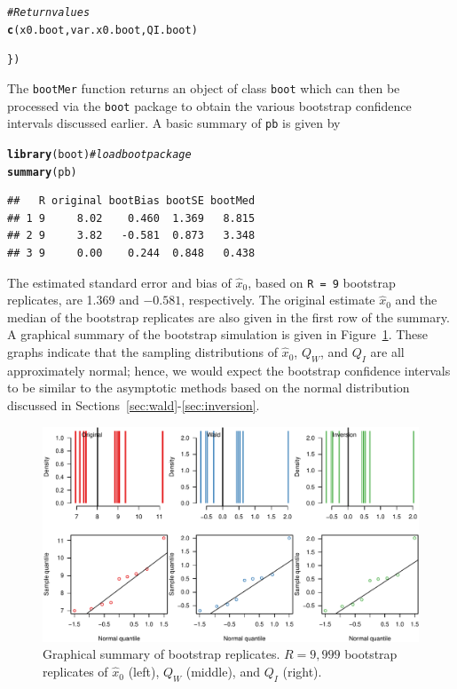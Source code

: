 \documentclass{article}\usepackage[]{graphicx}\usepackage[]{color}
\makeatletter
\newcommand{\hlcom}[1]{\textcolor[rgb]{0.678,0.584,0.686}{\textit{#1}}}%
\newcommand{\hlstd}[1]{\textcolor[rgb]{0.345,0.345,0.345}{#1}}%
\newcommand{\hlkwd}[1]{\textcolor[rgb]{0.737,0.353,0.396}{\textbf{#1}}}%
\newenvironment{kframe}{%
 \def\at@end@of@kframe{}%
 \ifinner\ifhmode%
  \def\at@end@of@kframe{\end{minipage}}%
  \begin{minipage}{\columnwidth}%
 \fi\fi%
 \def\FrameCommand##1{\hskip\@totalleftmargin \hskip-\fboxsep
 \colorbox{shadecolor}{##1}\hskip-\fboxsep
     \hskip-\linewidth \hskip-\@totalleftmargin \hskip\columnwidth}%
 \MakeFramed {\advance\hsize-\width
   \@totalleftmargin\z@ \linewidth\hsize
   \@setminipage}}%
 {\par\unskip\endMakeFramed%
 \at@end@of@kframe}
\newenvironment{knitrout}{}{} %
\makeatother
\begin{document}
\begin{knitrout}
\begin{kframe}
\begin{alltt}
  \hlcom{# Return values}
  \hlkwd{c}\hlstd{(x0.boot, var.x0.boot, QI.boot)}

\hlstd{\})}
\end{alltt}
\end{kframe}
\end{knitrout}
The \texttt{bootMer} function returns an object of class \texttt{boot} which can then be processed via the \texttt{boot} package to obtain the various bootstrap confidence intervals discussed earlier.  A basic summary of \texttt{pb} is given by
\begin{knitrout}
\color{fgcolor}\begin{kframe}
\begin{alltt}
\hlkwd{library}\hlstd{(boot)}  \hlcom{# load boot package}
\hlkwd{summary}\hlstd{(pb)}
\end{alltt}
\begin{verbatim}
##   R original bootBias bootSE bootMed
## 1 9     8.02    0.460  1.369   8.815
## 2 9     3.82   -0.581  0.873   3.348
## 3 9     0.00    0.244  0.848   0.438
\end{verbatim}
\end{kframe}
\end{knitrout}
The estimated standard error and bias of $\widehat{x}_0$, based on \texttt{R = 9} bootstrap replicates, are 1.369 and \ensuremath{-0.581}, respectively.  The original estimate $\widehat{x}_0$ and the median of the bootstrap replicates are also given in the first row of the summary.  A graphical summary of the bootstrap simulation is given in Figure~\ref{fig:boot-plots}.  These graphs indicate that the sampling distributions of $\widehat{x}_0$, $Q_W$, and $Q_I$ are all approximately normal; hence, we would expect the bootstrap confidence intervals to be similar to the asymptotic methods based on the normal distribution discussed in Sections~\ref{sec:wald}-\ref{sec:inversion}.
\begin{knitrout}
\color{fgcolor}\begin{figure}[!htb]
\includegraphics[width=\linewidth]{figure/boot-plots-1} \caption[Graphical summary of bootstrap replicates]{Graphical summary of bootstrap replicates. $R = 9,999$ bootstrap replicates of $\widehat{x}_0$ (left), $Q_W$ (middle), and $Q_I$ (right).}\label{fig:boot-plots}
\end{figure}


\end{knitrout}
\end{document}
